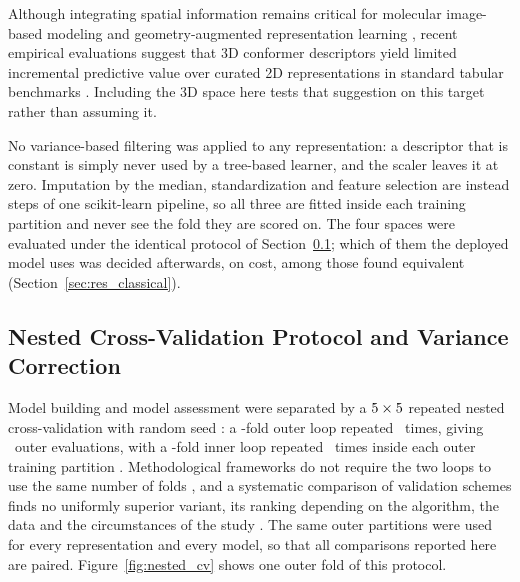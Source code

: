 Although integrating spatial information remains critical for molecular image-based modeling \citep{matsu2023} and geometry-augmented representation learning \citep{yanan2024}, recent empirical evaluations suggest that 3D conformer descriptors yield limited incremental predictive value over curated 2D representations in standard tabular benchmarks \citep{tiwari2026}. Including the 3D space here tests that suggestion on this target rather than assuming it.

No variance-based filtering was applied to any representation: a descriptor that is constant is simply never used by a
tree-based learner, and the scaler leaves it at zero. Imputation by the median, standardization and feature selection
are instead steps of one scikit-learn pipeline, so all three are fitted inside each training partition and never see
the fold they are scored on. The four spaces were evaluated under the identical protocol of
Section~\ref{sec:materials_ncv}; which of them the deployed model uses was decided afterwards, on cost, among those
found equivalent (Section~\ref{sec:res_classical}).


\subsection{Nested Cross-Validation Protocol and Variance Correction}
\label{sec:materials_ncv}

Model building and model assessment were separated by a $5 \times 5$ repeated nested
cross-validation with random seed \RandomSeed: a \OuterKFolds-fold outer loop repeated \OuterRepeats\ times, giving
\TotalOuterFolds\ outer evaluations, with a \InnerKFolds-fold inner loop repeated \InnerRepeats\ times inside
each outer training partition
\citep{krstajic2014, cawley2010}. Methodological frameworks do not require the two loops to use the same number of
folds \citep{krstajic2014}, and a systematic comparison of validation schemes finds no uniformly superior variant, its
ranking depending on the algorithm, the data and the circumstances of the study \citep{heberger2023}. The same outer
partitions were used for every representation and every model, so that all comparisons reported here are paired.
Figure~\ref{fig:nested_cv} shows one outer fold of this protocol.



